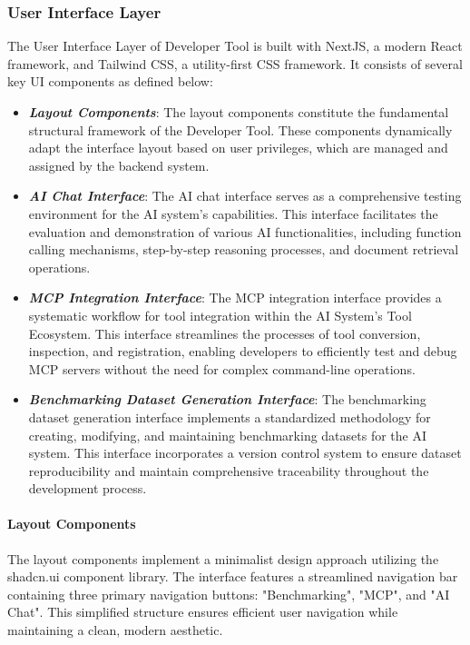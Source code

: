 \documentclass[../Main.tex]{subfiles}
\begin{document}
{{	\subsubsection{User Interface Layer}
	\label{section:4.4.2.1_user_interface_layer}
	The User Interface Layer of Developer Tool is built with NextJS, a modern React framework, and Tailwind CSS, a utility-first CSS framework. It consists of several key UI components as defined below:
	\begin{itemize}
		\item \emph{\textbf{Layout Components}}: The layout components constitute the fundamental structural framework of the Developer Tool. These components dynamically adapt the interface layout based on user privileges, which are managed and assigned by the backend system.
		
		\item \emph{\textbf{AI Chat Interface}}: The AI chat interface serves as a comprehensive testing environment for the AI system's capabilities. This interface facilitates the evaluation and demonstration of various AI functionalities, including function calling mechanisms, step-by-step reasoning processes, and document retrieval operations.
		
		\item \emph{\textbf{MCP Integration Interface}}: The MCP integration interface provides a systematic workflow for tool integration within the AI System's Tool Ecosystem. This interface streamlines the processes of tool conversion, inspection, and registration, enabling developers to efficiently test and debug MCP servers without the need for complex command-line operations.
		
		\item \emph{\textbf{Benchmarking Dataset Generation Interface}}: The benchmarking dataset generation interface implements a standardized methodology for creating, modifying, and maintaining benchmarking datasets for the AI system. This interface incorporates a version control system to ensure dataset reproducibility and maintain comprehensive traceability throughout the development process.
	\end{itemize}

	\paragraph{Layout Components} The layout components implement a minimalist design approach utilizing the shadcn.ui component library. The interface features a streamlined navigation bar containing three primary navigation buttons: "Benchmarking", "MCP", and "AI Chat". This simplified structure ensures efficient user navigation while maintaining a clean, modern aesthetic.
}}
\end{document}
